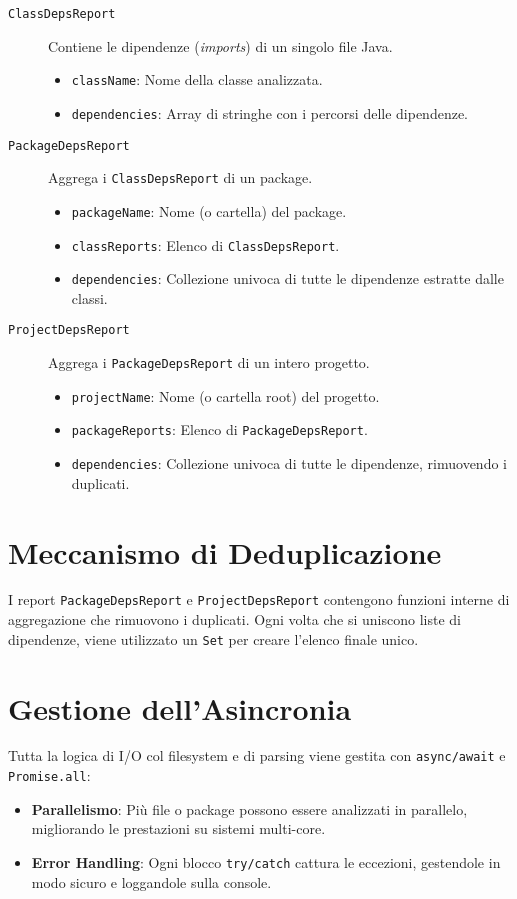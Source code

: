 \documentclass[a4paper,12pt]{article}
\begin{document}
\begin{description}
  \item[\texttt{ClassDepsReport}] Contiene le dipendenze (\textit{imports}) di un singolo file Java.
    \begin{itemize}
      \item \texttt{className}: Nome della classe analizzata.
      \item \texttt{dependencies}: Array di stringhe con i percorsi delle dipendenze.
    \end{itemize}

  \item[\texttt{PackageDepsReport}] Aggrega i \texttt{ClassDepsReport} di un package.
    \begin{itemize}
      \item \texttt{packageName}: Nome (o cartella) del package.
      \item \texttt{classReports}: Elenco di \texttt{ClassDepsReport}.
      \item \texttt{dependencies}: Collezione univoca di tutte le dipendenze estratte dalle classi.
    \end{itemize}

  \item[\texttt{ProjectDepsReport}] Aggrega i \texttt{PackageDepsReport} di un intero progetto.
    \begin{itemize}
      \item \texttt{projectName}: Nome (o cartella root) del progetto.
      \item \texttt{packageReports}: Elenco di \texttt{PackageDepsReport}.
      \item \texttt{dependencies}: Collezione univoca di tutte le dipendenze, rimuovendo i duplicati.
    \end{itemize}
\end{description}

\section{Meccanismo di Deduplicazione}
I report \texttt{PackageDepsReport} e \texttt{ProjectDepsReport} contengono funzioni interne di aggregazione che rimuovono i duplicati. Ogni volta che si uniscono liste di dipendenze, viene utilizzato un \texttt{Set} per creare l'elenco finale unico.

\section{Gestione dell'Asincronia}
Tutta la logica di I/O col filesystem e di parsing viene gestita con \texttt{async/await} e \texttt{Promise.all}:
\begin{itemize}
  \item \textbf{Parallelismo}: Pi\`u file o package possono essere analizzati in parallelo, migliorando le prestazioni su sistemi multi-core.
  \item \textbf{Error Handling}: Ogni blocco \texttt{try/catch} cattura le eccezioni, gestendole in modo sicuro e loggandole sulla console.
\end{itemize}
\end{document}
